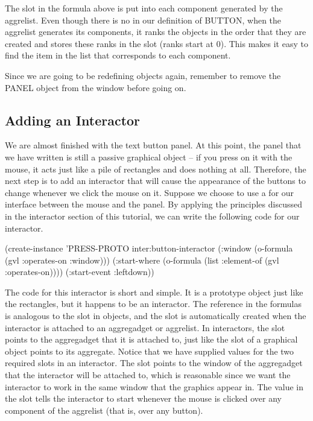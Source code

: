 The  slot in the  formula above is put into each
component generated by the aggrelist.  Even though there is no
 in our definition of BUTTON, when the aggrelist generates
its components, it ranks the objects in the order that they are
created and stores these ranks in the  slot (ranks start at 0).
This makes it easy to find the item in the  list that
corresponds to each component.

Since we are going to be redefining objects again, remember to remove
the PANEL object from the window before going on.


\subsection{Adding an Interactor}

We are almost finished with the text button panel.
At this point, the panel that we have written is still a passive
graphical object -- if you press on it with the mouse, it acts just
like a pile of rectangles and does nothing at all.  Therefore, the
next step is to add an interactor that will cause the appearance of
the buttons to change whenever we click the mouse on it.  Suppose we
choose to use a  for our interface between the
mouse and the panel.  By applying the principles discussed in
the interactor section of this tutorial, we can write the following
code for our interactor.

\begin{programexample}
(create-instance 'PRESS-PROTO inter:button-interactor
   (:window (o-formula (gvl :operates-on :window)))
   (:start-where (o-formula (list :element-of (gvl :operates-on))))
   (:start-event :leftdown))
\end{programexample}

The code for this interactor is short and simple.  It is a
prototype object just like the rectangles, but it happens to be an
interactor.  The  reference in the formulas is
analogous to the  slot in objects, and the slot is
automatically created when the interactor is attached to an
aggregadget or aggrelist.  In interactors, the
 slot points to the aggregadget that it is attached
to, just like the  slot of a graphical object points to
its aggregate.  Notice that we have supplied values for the two
required slots in an interactor.  The  slot points to the
window of the aggregadget that the interactor will be attached to,
which is reasonable since we want the interactor to work in the same
window that the graphics appear in.  The value in the
 slot tells the interactor to start whenever the
mouse is clicked over any component of the aggrelist (that is, over
any button).

